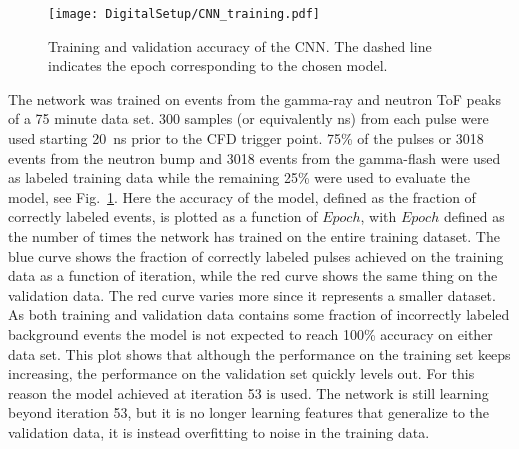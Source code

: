 \documentclass[main.tex]{subfiles}
\begin{document}
\begin{figure}[ht!]
    \centering
        \texttt{[image: DigitalSetup/CNN\_training.pdf]}
        \caption[Training and validation accuracy of the CNN.]{Training and validation accuracy of the CNN. The dashed line indicates the epoch corresponding to the chosen model.}
    \label{fig:CNN_training} 
\end{figure}

The network was trained on events from the gamma-ray and neutron ToF peaks of a 75 minute data set. 300 samples (or equivalently ns) from each pulse were used starting \SI{20}{ns} prior to the CFD trigger point. 75\% of the pulses or 3018 events from the neutron bump and 3018 events from the gamma-flash were used as labeled training data while the remaining 25\% were used to evaluate the model, see Fig.~\ref{fig:CNN_training}. Here the accuracy of the model, defined as the fraction of correctly labeled events, is plotted as a function of $Epoch$, with $Epoch$ defined as the number of times the network has trained on the entire training dataset. The blue curve shows the fraction of correctly labeled pulses achieved on the training data as a function of iteration, while the red curve shows the same thing on the validation data. The red curve varies more since it represents a smaller dataset. As both training and validation data contains some fraction of incorrectly labeled background events the model is not expected to reach 100\% accuracy on either data set. This plot shows that although the performance on the training set keeps increasing, the performance on the validation set quickly levels out. For this reason the model achieved at iteration 53 is used. The network is still learning beyond iteration 53, but it is no longer learning features that generalize to the validation data, it is instead overfitting to noise in the training data.
\end{document}
